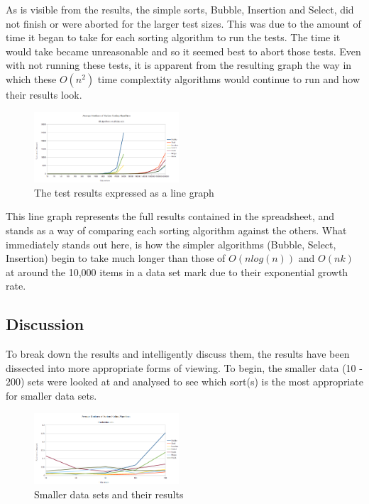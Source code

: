 \documentclass{acm_proc_article-sp}
\begin{document}
As is visible from the results, the simple sorts, Bubble, Insertion and Select,
did not finish or were aborted for the larger test sizes. This was due to the amount of time it began to
take for each sorting algorithm to run the tests. The time it would take became
unreasonable and so it seemed best to abort those tests. Even with not running
these tests, it is apparent from the resulting graph the way in which these  \begin{math}O(n^2)\end{math} time complextity\cite{timec} algorithms
would continue to run and how their results look.

\begin{figure}[h]
\centering
\includegraphics[width=0.48\textwidth]{img/graph_all_tests.png}
\caption{The test results expressed as a line graph}
\end{figure}

This line graph represents the full results contained in the spreadsheet, and stands
as a way of comparing each sorting algorithm against the others. What 
immediately stands out here, is how the simpler algorithms (Bubble, Select, Insertion) begin to take much 
longer than those of \begin{math}O(n log(n))\end{math} and \begin{math}O(nk)\end{math}
 at around the 10,000 items in a data set mark due to their exponential growth rate.

\subsection{Discussion}
To break down the results and intelligently discuss them, the results have been dissected
into more appropriate forms of viewing. To begin, the smaller data (10 - 200) sets were looked at and
analysed to see which sort(s) is the most appropriate for smaller data sets.

\begin{figure}[h]
\centering
\includegraphics[width=0.48\textwidth]{img/graph_smaller.png}
\caption{Smaller data sets and their results}
\end{figure}
\end{document}
